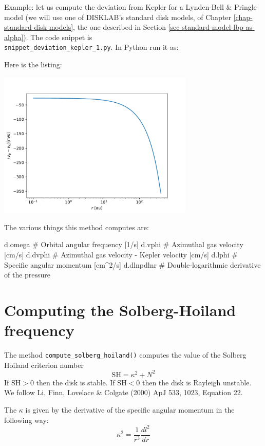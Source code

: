 \documentclass{book}
\newcommand{\code}[1]{{\small\tt #1}}
\begin{document}
Example: let us compute the deviation from Kepler for a Lynden-Bell \& Pringle
model (we will use one of {\sf DISKLAB}'s standard disk models, of Chapter
\ref{chap-standard-disk-models}, the one described in Section
\ref{sec-standard-model-lbp-as-alpha}). The code snippet is\\
\code{snippet\_deviation\_kepler\_1.py}. In Python run it as:
\begin{codebox}
\end{codebox}
Here is the listing:

\centerline{\includegraphics[width=0.7\textwidth]{../snippets/fig_snippet_deviation_kepler_1_1.pdf}}
The various things this method computes are:
\begin{codebox}
d.omega       # Orbital angular frequency [1/s]
d.vphi        # Azimuthal gas velocity [cm/s]
d.dvphi       # Azimuthal gas velocity - Kepler velocity [cm/s]
d.lphi        # Specific angular momentum [cm^2/s]
d.dlnpdlnr    # Double-logarithmic derivative of the pressure
\end{codebox}

\section{Computing the Solberg-Hoiland frequency}
The method \code{compute\_solberg\_hoiland()} computes the value of
the Solberg Hoiland criterion number
\begin{equation}
\mathrm{SH} = \kappa^2 + N^2
\end{equation}
If $\mathrm{SH}>0$ then the disk is stable. If $\mathrm{SH}<0$ then the disk is
Rayleigh unstable. We follow Li, Finn, Lovelace \& Colgate (2000) ApJ 533, 1023,
Equation 22.

The $\kappa$ is given by the derivative of the specific angular momentum in the
following way:
\begin{equation}
\kappa^2 = \frac{1}{r^3}\frac{dl^2}{dr}
\end{equation}
\end{document}
